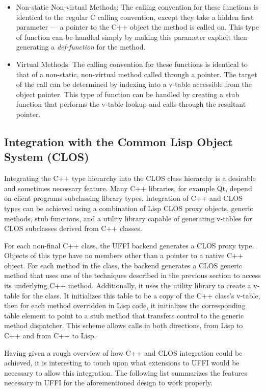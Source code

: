 \documentclass[12pt]{article}
\begin{document}
\begin{itemize}

\item Non-static Non-virtual Methods: The calling convention for these functions is identical to the regular C calling convention, except they take a hidden first parameter --- a pointer to the C++ object the method is called on. This type of function can be handled simply by making this parameter explicit then generating a \emph{def-function} for the method.
\item Virtual Methods: The calling convention for these functions is identical to that of a non-static, non-virtual method called through a pointer. The target of the call can be determined by indexing into a v-table accessible from the object pointer. This type of function can be handled by creating a stub function that performs the v-table lookup and calls through the resultant pointer.
\end{itemize}

\subsection{Integration with the Common Lisp Object System (CLOS)}
Integrating the C++ type hierarchy into the CLOS class hierarchy is a desirable and sometimes necessary feature. Many C++ libraries, for example Qt, depend on client programs subclassing library types. Integration of C++ and CLOS types can be achieved using a combination of Lisp CLOS proxy objects, generic methods, stub functions, and a utility library capable of generating v-tables for CLOS subclasses derived from C++ classes. 

For each non-final C++ class, the UFFI backend generates a CLOS proxy type. Objects of this type have no members other than a pointer to a native C++ object. For each method in the class, the backend generates a CLOS generic method that uses one of the techniques described in the previous section to access its underlying C++ method. Additionally, it uses the utility library to create a v-table for the class. It initializes this table to be a copy of the C++ class's v-table, then for each method overridden in Lisp code, it initializes the corresponding table element to point to a stub method that transfers control to the generic method dispatcher. This scheme allows calls in both directions, from Lisp to C++ and from C++ to Lisp. 

Having given a rough overview of how C++ and CLOS integration could be achieved, it is interesting to touch upon what extensions to UFFI would be necessary to allow this integration. The following list summarizes the features necessary in UFFI for the aforementioned design to work properly.
\end{document}
